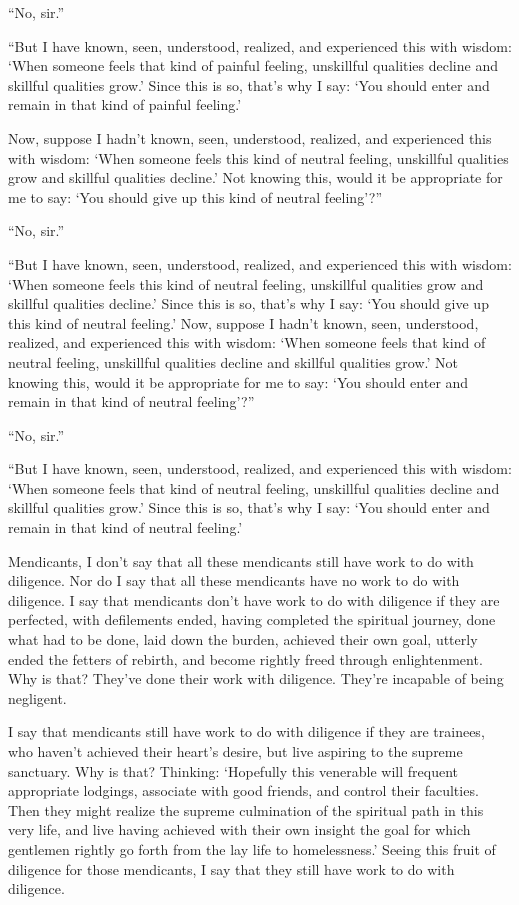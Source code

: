 \documentclass[12pt,openany]{book}%
\begin{document}
“No, sir.” 

“But I have known, seen, understood, realized, and experienced this with wisdom: ‘When someone feels that kind of painful feeling, unskillful qualities decline and skillful qualities grow.’ Since this is so, that’s why I say: ‘You should enter and remain in that kind of painful feeling.’ 

Now, suppose I hadn’t known, seen, understood, realized, and experienced this with wisdom: ‘When someone feels this kind of neutral feeling, unskillful qualities grow and skillful qualities decline.’ Not knowing this, would it be appropriate for me to say: ‘You should give up this kind of neutral feeling’?” 

“No, sir.” 

“But I have known, seen, understood, realized, and experienced this with wisdom: ‘When someone feels this kind of neutral feeling, unskillful qualities grow and skillful qualities decline.’ Since this is so, that’s why I say: ‘You should give up this kind of neutral feeling.’ Now, suppose I hadn’t known, seen, understood, realized, and experienced this with wisdom: ‘When someone feels that kind of neutral feeling, unskillful qualities decline and skillful qualities grow.’ Not knowing this, would it be appropriate for me to say: ‘You should enter and remain in that kind of neutral feeling’?” 

“No, sir.” 

“But I have known, seen, understood, realized, and experienced this with wisdom: ‘When someone feels that kind of neutral feeling, unskillful qualities decline and skillful qualities grow.’ Since this is so, that’s why I say: ‘You should enter and remain in that kind of neutral feeling.’ 

Mendicants, I don’t say that all these mendicants still have work to do with diligence. Nor do I say that all these mendicants have no work to do with diligence. I say that mendicants don’t have work to do with diligence if they are perfected, with defilements ended, having completed the spiritual journey, done what had to be done, laid down the burden, achieved their own goal, utterly ended the fetters of rebirth, and become rightly freed through enlightenment. Why is that? They’ve done their work with diligence. They’re incapable of being negligent. 

I say that mendicants still have work to do with diligence if they are trainees, who haven’t achieved their heart’s desire, but live aspiring to the supreme sanctuary. Why is that? Thinking: ‘Hopefully this venerable will frequent appropriate lodgings, associate with good friends, and control their faculties. Then they might realize the supreme culmination of the spiritual path in this very life, and live having achieved with their own insight the goal for which gentlemen rightly go forth from the lay life to homelessness.’ Seeing this fruit of diligence for those mendicants, I say that they still have work to do with diligence. 
\end{document}
